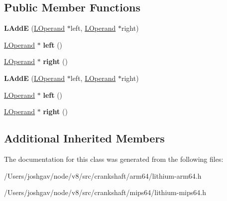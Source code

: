 \subsection*{Public Member Functions}
\begin{DoxyCompactItemize}
\item 
{\bfseries L\+AddE} (\hyperlink{classv8_1_1internal_1_1_l_operand}{L\+Operand} $\ast$left, \hyperlink{classv8_1_1internal_1_1_l_operand}{L\+Operand} $\ast$right)\hypertarget{classv8_1_1internal_1_1_l_add_e_a13400e31a80b6551f56b7648a991ca04}{}\label{classv8_1_1internal_1_1_l_add_e_a13400e31a80b6551f56b7648a991ca04}

\item 
\hyperlink{classv8_1_1internal_1_1_l_operand}{L\+Operand} $\ast$ {\bfseries left} ()\hypertarget{classv8_1_1internal_1_1_l_add_e_a32d397be35a140bdad09e9139f84d00b}{}\label{classv8_1_1internal_1_1_l_add_e_a32d397be35a140bdad09e9139f84d00b}

\item 
\hyperlink{classv8_1_1internal_1_1_l_operand}{L\+Operand} $\ast$ {\bfseries right} ()\hypertarget{classv8_1_1internal_1_1_l_add_e_a98ba3c6334ea2fb7cab39f6f59ca74f7}{}\label{classv8_1_1internal_1_1_l_add_e_a98ba3c6334ea2fb7cab39f6f59ca74f7}

\item 
{\bfseries L\+AddE} (\hyperlink{classv8_1_1internal_1_1_l_operand}{L\+Operand} $\ast$left, \hyperlink{classv8_1_1internal_1_1_l_operand}{L\+Operand} $\ast$right)\hypertarget{classv8_1_1internal_1_1_l_add_e_a13400e31a80b6551f56b7648a991ca04}{}\label{classv8_1_1internal_1_1_l_add_e_a13400e31a80b6551f56b7648a991ca04}

\item 
\hyperlink{classv8_1_1internal_1_1_l_operand}{L\+Operand} $\ast$ {\bfseries left} ()\hypertarget{classv8_1_1internal_1_1_l_add_e_a32d397be35a140bdad09e9139f84d00b}{}\label{classv8_1_1internal_1_1_l_add_e_a32d397be35a140bdad09e9139f84d00b}

\item 
\hyperlink{classv8_1_1internal_1_1_l_operand}{L\+Operand} $\ast$ {\bfseries right} ()\hypertarget{classv8_1_1internal_1_1_l_add_e_a98ba3c6334ea2fb7cab39f6f59ca74f7}{}\label{classv8_1_1internal_1_1_l_add_e_a98ba3c6334ea2fb7cab39f6f59ca74f7}

\end{DoxyCompactItemize}
\subsection*{Additional Inherited Members}


The documentation for this class was generated from the following files\+:\begin{DoxyCompactItemize}
\item 
/\+Users/joshgav/node/v8/src/crankshaft/arm64/lithium-\/arm64.\+h\item 
/\+Users/joshgav/node/v8/src/crankshaft/mips64/lithium-\/mips64.\+h\end{DoxyCompactItemize}
